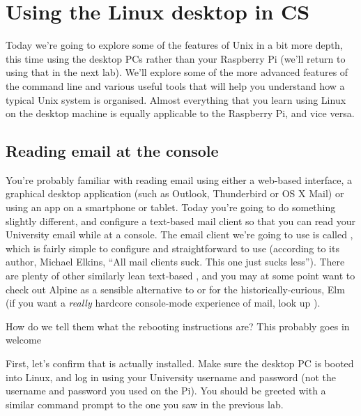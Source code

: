 \chapter{Using the Linux desktop in CS}


Today we're going to explore some of the features of Unix in a bit more depth, this time using the desktop PCs rather than your Raspberry Pi (we'll return to using that in the next lab). We'll explore some of the more advanced features of the command line and various useful tools that will help you understand how a typical Unix system is organised. Almost everything that you learn using Linux on the desktop machine is equally applicable to the Raspberry Pi, and vice versa. 

\section{Reading email at the console}

You're probably familiar with reading email using either a web-based interface, a graphical desktop application (such as Outlook, Thunderbird or OS X Mail) or using an app on a smartphone or tablet. Today you're going to do something slightly different, and configure a text-based mail client so that you can read your University email while at a console. The email client we're going to use is called , which is fairly simple to configure and straightforward to use (according to its author, Michael Elkins, ``All mail clients suck. This one just sucks less''). There are plenty of other similarly lean text-based , and you may at some point want to check out Alpine as a sensible alternative to  or for the historically-curious, Elm (if you want a \textit{really} hardcore console-mode experience of mail, look up ).

\begin{note}
How do we tell them what the rebooting instructions are? This probably goes in welcome
\end{note}

First, let's confirm that  is actually installed. Make sure the desktop PC is booted into Linux, and log in using your University username and password (not the username and password you used on the Pi). You should be greeted with a similar command prompt to the one you saw in the previous lab.


